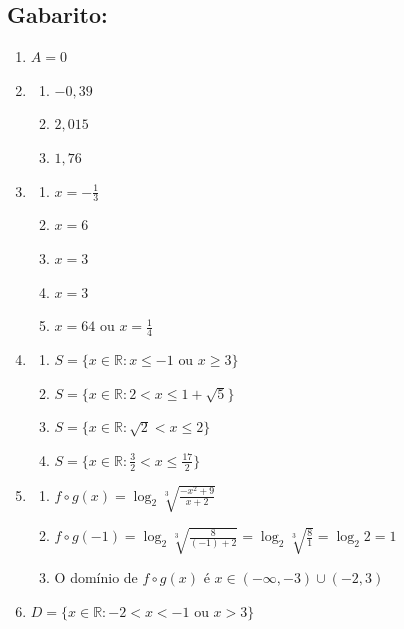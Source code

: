 \subsection{Gabarito:}
\begin{enumerate}
    \item $A=0$
    \item
    \begin{enumerate}
\item $-0,39$
\item $2,015$
\item $1,76$
\end{enumerate}
\item
\begin{enumerate}
\item $x = -\frac{1}{3}$
\item $x = 6$
\item $x = 3$
\item $x = 3$
\item $x = 64$ ou $x = \frac{1}{4}$
\end{enumerate}
\item
\begin{enumerate}
\item $S=\{x \in \mathbb{R} : x \leq -1 \text{ ou } x \geq 3 \}$
\item $S=\{x \in \mathbb{R} : 2<x\leq1+\sqrt{5} \}$
\item $S=\{x \in \mathbb{R} : \sqrt{2} <x\leq2 \}$
\item $S=\{x \in \mathbb{R} : \frac{3}{2}<x\leq \frac{17}{2}\}$
\end{enumerate}
\item
\begin{enumerate}
\item $f\circ g(x) = \log_2\sqrt[3]{\frac{-x^2+9}{x+2}}$
\item $f\circ g(-1) = \log_2\sqrt[3]{\frac{8}{(-1)+2}}=\log_2\sqrt[3]{\frac{8}{1}}= \log_2 2 = 1$
\item O domínio de $f\circ g(x)$ é $x\in (-\infty,-3)\cup (-2,3)$
\end{enumerate}
\item $D =\{x \in \mathbb{R}: -2<x<-1 \,\, \text{ou} \,\,x>3 \}$


\end{enumerate}
